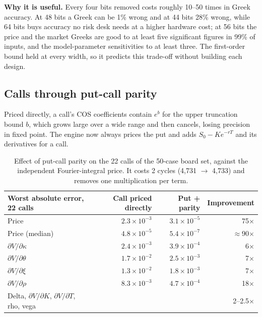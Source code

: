 \documentclass[11pt,a4paper]{article}
\newcommand{\useful}[1]{\par\noindent\textbf{\textcolor{accent}{Why it is useful.}} #1\par}
\newcommand{\hi}{\rowcolor{accentsoft}}
\begin{document}
\useful{Every four bits removed costs roughly 10--50 times in Greek accuracy. At 48 bits
a Greek can be 1\% wrong and at 44 bits 28\% wrong, while 64 bits buys accuracy no risk
desk needs at a higher hardware cost; at 56 bits the price and the market Greeks are
good to at least five significant figures in 99\% of inputs, and the model-parameter
sensitivities to at least three. The first-order bound held at every width, so it predicts this
trade-off without building each design.}

\subsection{Calls through put-call parity}
\label{sec:parity}
Priced directly, a call's COS coefficients contain $e^{b}$ for the upper truncation
bound $b$, which grows large over a wide range and then cancels, losing precision in
fixed point. The engine now always prices the put and adds
$S_0 - K e^{-rT}$ and its derivatives for a call.

\begin{table}[H]
\centering
\small
\begin{tabular}{@{}lrrr@{}}
\toprule
\textbf{Worst absolute error, 22 calls} & \textbf{Call priced directly} & \textbf{Put + parity} & \textbf{Improvement}\\
\midrule
\hi Price & $2.3\times10^{-3}$ & $3.1\times10^{-5}$ & 75$\times$\\
Price (median) & $4.8\times10^{-5}$ & $5.4\times10^{-7}$ & $\approx$90$\times$\\
$\partial V/\partial\kappa$ & $2.4\times10^{-3}$ & $3.9\times10^{-4}$ & 6$\times$\\
$\partial V/\partial\theta$ & $1.7\times10^{-2}$ & $2.5\times10^{-3}$ & 7$\times$\\
$\partial V/\partial\xi$ & $1.3\times10^{-2}$ & $1.8\times10^{-3}$ & 7$\times$\\
$\partial V/\partial\rho$ & $8.3\times10^{-3}$ & $4.7\times10^{-4}$ & 18$\times$\\
Delta, $\partial V/\partial K$, $\partial V/\partial T$, rho, vega & & & 2--2.5$\times$\\
\bottomrule
\end{tabular}
\caption{Effect of put-call parity on the 22 calls of the 50-case board set, against
the independent Fourier-integral price. It costs 2 cycles (4,731 $\rightarrow$ 4,733)
and removes one multiplication per term.}
\end{table}
\end{document}

